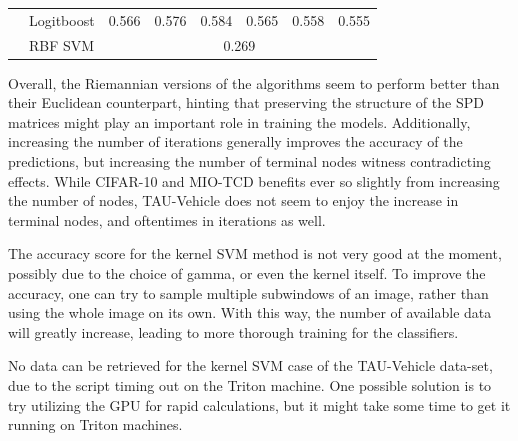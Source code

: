 \documentclass[12pt]{article}
\begin{document}
\begin{sloppypar}
\begin{table}
\begin{tabular}{lllllllll}
                                       & \multicolumn{2}{l}{Logitboost}                            & 0.566                           & 0.576                            & 0.584                            & 0.565                           & 0.558                            & 0.555                            \\
                                       & \multicolumn{2}{l}{RBF SVM}                               & \multicolumn{6}{c}{0.269}                                                                                                                                                                                     \\ \hline
\end{tabular}
\end{table}
\vspace{5mm}
\noindent
Overall, the Riemannian versions of the algorithms seem to perform better than their Euclidean counterpart, hinting that preserving the structure of the SPD matrices might play an important role in training the models. Additionally, increasing the number of iterations generally improves the accuracy of the predictions, but increasing the number of terminal nodes witness contradicting effects. While CIFAR-10 and MIO-TCD benefits ever so slightly from increasing the number of nodes, TAU-Vehicle does not seem to enjoy the increase in terminal nodes, and oftentimes in iterations as well.

\noindent
The accuracy score for the kernel SVM method is not very good at the moment, possibly due to the choice of gamma, or even the kernel itself. To improve the accuracy, one can try to sample multiple subwindows of an image, rather than using the whole image on its own. With this way, the number of available data will greatly increase, leading to more thorough training for the classifiers.

\noindent
No data can be retrieved for the kernel SVM case of the TAU-Vehicle data-set, due to the script timing out on the Triton machine. One possible solution is to try utilizing the GPU for rapid calculations, but it might take some time to get it running on Triton machines.

\newpage




\end{sloppypar}
\end{document}
